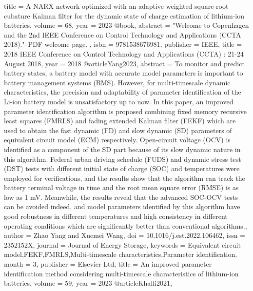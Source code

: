 {{{{{{{{{{   title = {A NARX network optimized with an adaptive weighted square-root cubature Kalman filter for the dynamic state of charge estimation of lithium-ion batteries},
   volume = {68},
   year = {2023}
}
@book{,
   abstract = {"Welcome to Copenhagen and the 2nd IEEE Conference on Control Technology and Applications (CCTA 2018)."--PDF welcome page. },
   isbn = {9781538676981},
   publisher = {IEEE},
   title = {2018 IEEE Conference on Control Technology and Applications (CCTA) : 21-24 August 2018},
   year = {2018}
}
@article{Yang2023,
   abstract = {To monitor and predict battery states, a battery model with accurate model parameters is important to battery management systems (BMS). However, for multi-timescale dynamic characteristics, the precision and adaptability of parameter identification of the Li-ion battery model is unsatisfactory up to now. In this paper, an improved parameter identification algorithm is proposed combining fixed memory recursive least squares (FMRLS) and fading extended Kalman filter (FEKF) which are used to obtain the fast dynamic (FD) and slow dynamic (SD) parameters of equivalent circuit model (ECM) respectively. Open-circuit voltage (OCV) is identified as a component of the SD part because of its slow dynamic nature in this algorithm. Federal urban driving schedule (FUDS) and dynamic stress test (DST) tests with different initial state of charge (SOC) and temperatures were employed for verifications, and the results show that the algorithm can track the battery terminal voltage in time and the root mean square error (RMSE) is as low as 1 mV. Meanwhile, the results reveal that the advanced SOC-OCV tests can be avoided indeed, and model parameters identified by this algorithm have good robustness in different temperatures and high consistency in different operating conditions which are significantly better than conventional algorithms.},
   author = {Zhao Yang and Xuemei Wang},
   doi = {10.1016/j.est.2022.106462},
   issn = {2352152X},
   journal = {Journal of Energy Storage},
   keywords = {Equivalent circuit model,FEKF,FMRLS,Multi-timescale characteristics,Parameter identification},
   month = {3},
   publisher = {Elsevier Ltd},
   title = {An improved parameter identification method considering multi-timescale characteristics of lithium-ion batteries},
   volume = {59},
   year = {2023}
}
@article{Khalfi2021,
}}}}}}}}}}
